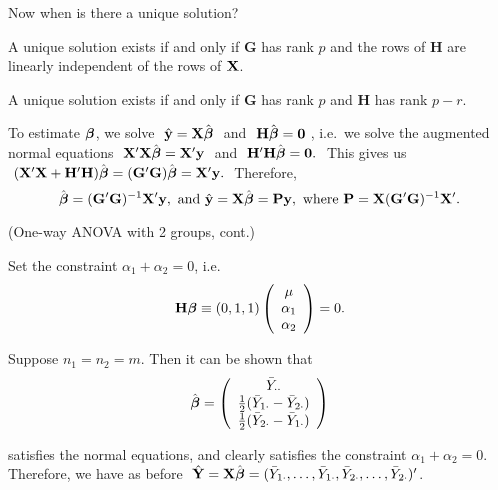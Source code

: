 Now when is there a unique solution?

\btheo
A unique solution exists if and only if $\mathbf G$ has rank $p$ and
the rows of $\mathbf H$ are linearly independent of the rows of
$\mathbf{X}$.
\estheo

\bstheo
A unique solution exists if and only if $\mathbf G$ has rank $p$ and
$\mathbf H$ has rank $p-r$.
\etheo

To estimate $\mbox{\boldmath $\beta$}$, we solve $\ \hat{\mathbf{y}}=\mathbf{X}\hat{\mbox{\boldmath $\beta$}}\ $ and
$\ \mathbf{H}\hat{\mbox{\boldmath $\beta$}}=\mathbf{0}\ $, i.e.~we solve the augmented
normal equations $\ \bfX'\bfX\hat{\bfbet} = \bfX'\bfy\ $ and $\
\mathbf{H'H} \hat{\mbox{\boldmath $\beta$}} = \mathbf{0}.\ $ This gives us  $\
(\mathbf{X}'\mathbf{X}+\mathbf{H'H}) \hat{\mbox{\boldmath $\beta$}}= (\mathbf{G'G})
\hat{\mbox{\boldmath $\beta$}}=\mathbf{X}'\mathbf{y}.\ $ Therefore,
$$
\hat{\mbox{\boldmath $\beta$}}=(\mathbf{G'G})^{-1}\mathbf{X}'\mathbf{y},
\
\mbox{and}
\
\hat{\mathbf{y}}=\mathbf{X}\hat{\mbox{\boldmath $\beta$}}=\mathbf{P}\mathbf{y},
\
\mbox{where}
\
\mathbf{P}=\mathbf{X}(\mathbf{G'G})^{-1}\mathbf{X}'.
$$

\bexa
(One-way ANOVA with 2 groups, cont.) 

Set the constraint $\alpha_1+\alpha_2=0$, i.e.
$$
\mathbf{H}\mbox{\boldmath $\beta$}\equiv (0, 1, 1)
	\left(\begin{array}{c}\mu\\\alpha_1\\\alpha_2\end{array}\right)=0.
$$

Suppose $n_1=n_2=m$.  Then it can be shown that
$$
\hat{\mbox{\boldmath $\beta$}}=
	\left(\begin{array}{c}
		\bar{Y}_{\cdot\cdot}\\
		{1\over 2}(\bar{Y}_{1\cdot}-\bar{Y}_{2\cdot})\\
		{1\over 2}(\bar{Y}_{2\cdot}-\bar{Y}_{1\cdot})\\
	\end{array}\right)
$$ 

satisfies the normal equations, and clearly satisfies the constraint
$\alpha_1+\alpha_2=0$.  Therefore, we have as before $\
\hat{\mathbf{Y}}=\mathbf{X}\hat{\mbox{\boldmath $\beta$}} =(\bar{Y}_{1\cdot}, \ldots,
\bar{Y}_{1\cdot}, \bar{Y}_{2\cdot}, \ldots, \bar{Y}_{2\cdot}) '$.

\eexa


